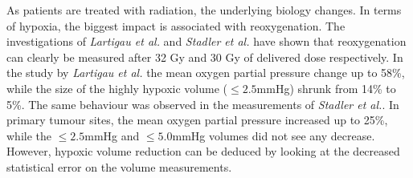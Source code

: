As patients are treated with radiation, the underlying biology changes. In terms of hypoxia, the biggest impact is associated with reoxygenation. The investigations of \textit{Lartigau et al.}\cite{pmid9797698} and \textit{Stadler et al.}\cite{pmid9783887} have shown that reoxygenation can clearly be measured after 32 Gy and 30 Gy of delivered dose respectively. In the study by \textit{Lartigau et al.} the mean oxygen partial pressure change up to 58\%, while the size of the highly hypoxic volume ($\leq 2.5$mmHg) shrunk from 14\% to 5\%. The same behaviour was observed in the measurements of \textit{Stadler et al.}. In primary tumour sites, the mean oxygen partial pressure increased up to 25\%, while the $\leq 2.5$mmHg and $\leq 5.0$mmHg volumes did not see any decrease. However, hypoxic volume reduction can be deduced by looking at the decreased statistical error on the volume measurements. 
